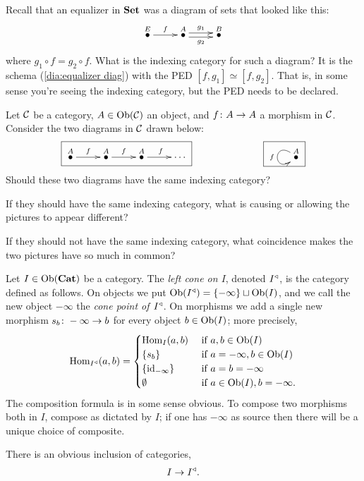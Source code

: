\begin{example}

Recall that an equalizer in ${\bf Set}$ was a diagram of sets that looked like this:
\begin{align}\label{dia:equalizer diag}
\xymatrix{\LMO{E}\ar[r]^f&\LMO{A}\ar@<.5ex>[r]^{g_1}\ar@<-.5ex>[r]_{g_2}&\LMO{B}}
\end{align}
where $g_1\circ f=g_2\circ f$. What is the indexing category for such a diagram? It is the schema (\ref{dia:equalizer diag}) with the PED $[f,g_1]\simeq[f,g_2]$. That is, in some sense you're seeing the indexing category, but the PED needs to be declared.

\end{example}

\begin{exercise}\label{exc:coincidence}
Let $\mathcal{C}$ be a category, $A\in\textnormal{Ob}(\mathcal{C})$ an object, and $f\colon A\rightarrow A$ a morphism in $\mathcal{C}$. Consider the two diagrams in $\mathcal{C}$ drawn below:
$$\fbox{\xymatrix{\LMO{A}\ar[r]^f&\LMO{A}\ar[r]^f&\LMO{A}\ar[r]^f&\cdots}}\hspace{1in}\fbox{\xymatrix{\LMO{A}\ar@(ul,dl)[]_f}}$$
\sexc Should these two diagrams have the same indexing category?
\item If they should have the same indexing category, what is causing or allowing the pictures to appear different?
\item If they should not have the same indexing category, what coincidence makes the two pictures have so much in common?
\endsexc
\end{exercise}

\begin{definition}\label{def:lcone}

Let $I\in\textnormal{Ob}({\bf Cat})$ be a category. The {\em left cone on $I$}, denoted $I^\triangleleft$, is the category defined as follows. On objects we put $\textnormal{Ob}(I^\triangleleft)=\{-\infty\}\sqcup\textnormal{Ob}(I)$, and we call the new object $-\infty$ the {\em cone point of $I^\triangleleft$}. On morphisms we add a single new morphism $s_b\colon-\infty\rightarrow b$ for every object $b\in\textnormal{Ob}(I)$; more precisely,
$$\textnormal{Hom}_{I^\triangleleft}(a,b)=
\begin{cases}
\textnormal{Hom}_I(a,b)&\textnormal{ if }a,b\in\textnormal{Ob}(I)\\
\{s_b\}&\textnormal{ if }a=-\infty, b\in\textnormal{Ob}(I)\\
\{\textnormal{id}_{-\infty}\}&\textnormal{ if } a=b=-\infty\\
\emptyset&\textnormal{ if } a\in\textnormal{Ob}(I), b=-\infty.
\end{cases}$$
The composition formula is in some sense obvious. To compose two morphisms both in $I$, compose as dictated by $I$; if one has $-\infty$ as source then there will be a unique choice of composite.

There is an obvious inclusion of categories,
\begin{align}\label{dia:inclusion into cone}
I\rightarrow I^\triangleleft.
\end{align}

\end{definition}


